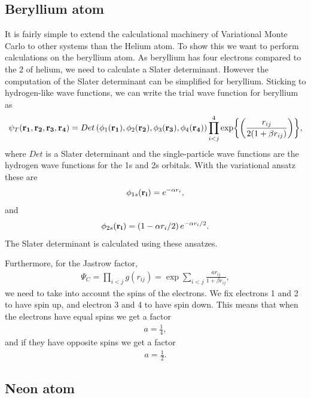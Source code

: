 \documentclass[x11names]{article}
\begin{document}
	\subsection{Beryllium atom}

		It is fairly simple to extend the calculational machinery of Variational
		Monte Carlo to other systems than the Helium atom. To show this we
		want to perform calculations on the beryllium atom. As beryllium has
		four electrons compared to the 2 of helium, we need to calculate a
		Slater determinant. However the computation of the Slater determinant
		can be simplified for beryllium. Sticking to hydrogen-like wave functions,
		we can write the trial wave function for beryllium as
		\begin{equation}
			\psi_{T}({\bf r_{1}},{\bf r_{2}},{\bf r_{3}},{\bf r_{4}})=Det\left(\phi_{1}({\bf r_{1}}),\phi_{2}({\bf r_{2}}),\phi_{3}({\bf r_{3}}),\phi_{4}({\bf r_{4}})\right)\prod_{i<j}^{4}\exp{\left(\frac{r_{ij}}{2(1+\beta r_{ij})}\right)},
			\label{eq:BerylliumTrialFunction}
		\end{equation}
		where $Det$ is a Slater determinant and the single-particle wave
		functions are the hydrogen wave functions for the 1s and 2s orbitals.
		With the variational ansatz these are
		\begin{align}
			\phi_{1s}({\bf r_{i}})=e^{-\alpha r_{i}},
		\end{align}
		and
		\begin{align}
			\phi_{2s}({\bf r_{i}})=\left(1-\alpha r_{i}/2\right)e^{-\alpha r_{i}/2}.
		\end{align}
		The Slater determinant is calculated using these ansatzes.

		Furthermore, for the Jastrow factor,
		\begin{align}
			\Psi_{C}=\prod_{i<j}g(r_{ij})=\exp{\sum_{i<j}\frac{ar_{ij}}{1+\beta r_{ij}}},
		\end{align}
		we need to take into account the spins of the electrons. We fix electrons
		1 and 2 to have spin up, and electron 3 and 4 to have spin down. This
		means that when the electrons have equal spins we get a factor
		\begin{align}
			a=\frac{1}{4},
		\end{align}
		and if they have opposite spins we get a factor
		\begin{align}
			a=\frac{1}{2}.
		\end{align}

	\subsection{Neon atom}
\end{document}
